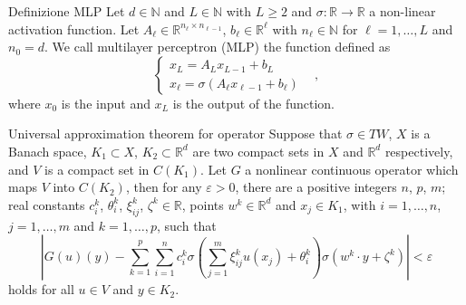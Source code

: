 \documentclass{beamer}
\newcommand{\numberset}{\mathbb}
\newcommand{\N}{\numberset{N}}
\newcommand{\R}{\numberset{R}}
\begin{document}

\begin{frame}[noframenumbering]{Definizione MLP}
	Let $ d \in \N $ and $ L\in \N $ with $ L \ge 2 $ and $ \sigma : \R \to \R  $ a non-linear activation function. Let $ A_{\ell} \in \R^{n_{\ell}\times n_{\ell-1}} $, $ b_{\ell} \in \R^{\ell} $ with $ n_{\ell}\in \N $ for $ \ell = 1, \dots, L $	and $ n_{0} = d $. We call multilayer perceptron (MLP) the function defined as
	\[ \begin{cases}
		x_{L} = A_{L}x_{L-1} + b_{L} \qquad & \\
		x_{\ell} = \sigma\left( A_{\ell}x_{\ell-1} + b_{\ell} \right) 
	\end{cases}, \]
	where $ x_0 $ is the input and $ x_{L} $ is the output of the function.
\end{frame}


\begin{frame}[noframenumbering]{Universal approximation theorem for operator}
	Suppose that $ \sigma \in TW $, $ X $ is a Banach space, $ K_1 \subset X $, $ K_2 \subset \R^d $ are two compact sets in $ X $ and $ \R^{d} $ respectively, and $ V $ is a compact set in $ C(K_1) $. Let $ G $ a nonlinear continuous operator which maps $ V $ into $ C(K_2) $, then for any $ \varepsilon > 0 $, there are a positive integers $ n $, $ p $, $ m $; real constants $ c_i^{k}$, $ \theta_i^{k}$, $ \xi_{ij}^{k} $, $ \zeta^k \in \R $, points $ w^{k} \in \R^d $ and $ x_j \in K_1 $, with $ i = 1, \dots, n$, $ j = 1, \dots, m $ and $ k = 1, \dots, p $, such that
	\[ \left| G(u)(y) - \sum_{k=1}^{p}\sum_{i=1}^{n}c_i^k \sigma \left( \sum_{j=1}^{m} \xi_{ij}^k u(x_j) + \theta_i^k \right) \sigma(w^k \cdot y + \zeta^k) \right| < \varepsilon  \]
	holds for all $ u \in V $ and $ y \in K_2 $.
\end{frame}
\end{document}

